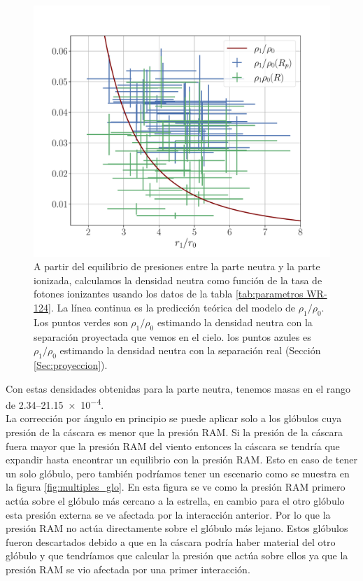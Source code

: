 \documentclass{book}
\begin{document}
\begin{figure}[htb]
    \centering
    \includegraphics[width=\textwidth]{Nuevas imagenes finales/rho_c.pdf}
    \caption{A partir del equilibrio de presiones entre la parte neutra y la parte ionizada, calculamos la densidad neutra como función de la tasa de fotones ionizantes usando los datos de la tabla \ref{tab:parametros WR-124}. La línea continua es la predicción teórica del modelo de $\rho_1/\rho_0$. Los puntos verdes son  $\rho_1/\rho_0$ estimando la densidad neutra con la separación proyectada que vemos en el cielo. los puntos azules es $\rho_1/\rho_0$ estimando la densidad neutra con la separación real (Sección \ref{Sec:proyeccion}).}
    \label{fig:n0_n1}
\end{figure}

Con estas densidades obtenidas para la parte neutra, tenemos masas en el rango de 2.34--\SI{21.15e-4}{\msun}.\\

La corrección por ángulo en principio se puede aplicar solo a los glóbulos cuya presión de la cáscara  es menor que la presión RAM. Si la presión de la cáscara fuera mayor que la presión RAM del viento entonces la cáscara se tendría que expandir hasta encontrar un equilibrio con la presión RAM. Esto en caso de tener un solo glóbulo, pero también podríamos tener un escenario como se muestra en la figura \ref{fig:multiples_glo}. En esta figura se ve como la presión RAM primero actúa sobre el glóbulo más cercano a la estrella, en cambio para el otro glóbulo esta presión externa se ve afectada por la interacción anterior. Por lo que la presión RAM no actúa directamente sobre el glóbulo más lejano. Estos glóbulos fueron descartados debido a que en la cáscara podría haber material del otro glóbulo y que tendríamos que calcular la presión que actúa sobre ellos ya que la presión RAM se vio afectada por una primer interacción.\\
\end{document}
